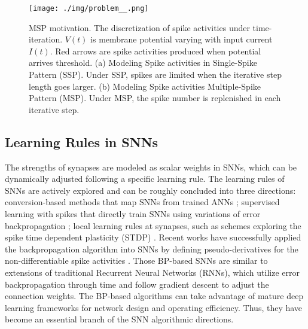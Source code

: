\documentclass{article}
\begin{document}
\begin{figure}[hbtp]
    \centering
    \texttt{[image: ./img/problem\_\_.png]}
    \caption{MSP motivation. The discretization of spike activities under time-iteration. $V(t)$ is membrane potential varying with input current $I(t)$. Red arrows are spike activities produced when potential arrives threshold. (a) Modeling Spike activities in Single-Spike Pattern (SSP). Under SSP, spikes are limited when the iterative step length goes larger. (b) Modeling Spike activities Multiple-Spike Pattern (MSP). Under MSP, the spike number is replenished in each iterative step.
}
    \label{fig:problem}
\end{figure}

\subsection{Learning Rules in SNNs}
The strengths of synapses are modeled as scalar weights in SNNs, which can be dynamically adjusted following a specific learning rule. The learning rules of SNNs are actively explored and can be roughly concluded into three directions: conversion-based methods that map SNNs from trained ANNs \cite{han_rmp-snn_2020}; supervised learning with spikes that directly train SNNs using variations of error backpropagation \cite{lee_training_2016,wu_spatio-temporal_2018}; local learning rules at synapses, such as schemes exploring the spike time dependent plasticity (STDP) \cite{song_competitive_2000}. Recent works have successfully applied the backpropagation algorithm into SNNs by defining pseudo-derivatives for the non-differentiable spike activities \cite{lee_training_2016,wu_spatio-temporal_2018,tavanaei_deep_2019,cheng_lisnn_2020}. 
Those BP-based SNNs are similar to extensions of traditional Recurrent Neural Networks (RNNs), which utilize error backpropagation through time and follow gradient descent to adjust the connection weights.
The BP-based algorithms can take advantage of mature deep learning frameworks for network design and operating efficiency.
Thus, they have become an essential branch of the SNN algorithmic directions.
\end{document}
